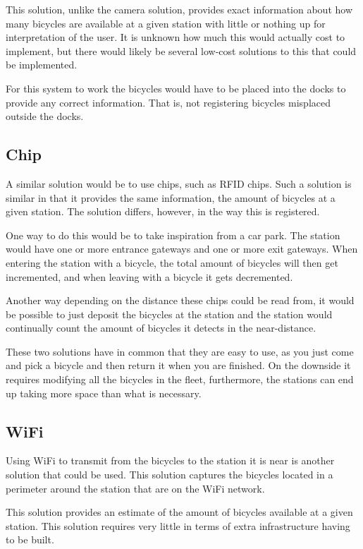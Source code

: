 This solution, unlike the camera solution, provides exact information about how many bicycles are available at a given station with little or nothing up for interpretation of the user.
It is unknown how much this would actually cost to implement, but there would likely be several low-cost solutions to this that could be implemented.

For this system to work the bicycles would have to be placed into the docks to provide any correct information.
That is, not registering bicycles misplaced outside the docks.

\subsection{Chip}
A similar solution would be to use chips, such as RFID chips. 
Such a solution is similar in that it provides the same information, the amount of bicycles at a given station.
The solution differs, however, in the way this is registered.

One way to do this would be to take inspiration from a car park.
The station would have one or more entrance gateways and one or more exit gateways.
When entering the station with a bicycle, the total amount of bicycles will then get incremented, and when leaving with a bicycle it gets decremented.

Another way depending on the distance these chips could be read from, it would be possible to just deposit the bicycles at the station and the station would continually count the amount of bicycles it detects in the near-distance.

These two solutions have in common that they are easy to use, as you just come and pick a bicycle and then return it when you are finished.
On the downside it requires modifying all the bicycles in the fleet, furthermore, the stations can end up taking more space than what is necessary.


\subsection{WiFi}
Using WiFi to transmit from the bicycles to the station it is near is another solution that could be used.
This solution captures the bicycles located in a perimeter around the station that are on the WiFi network.

This solution provides an estimate of the amount of bicycles available at a given station.
This solution requires very little in terms of extra infrastructure having to be built.

